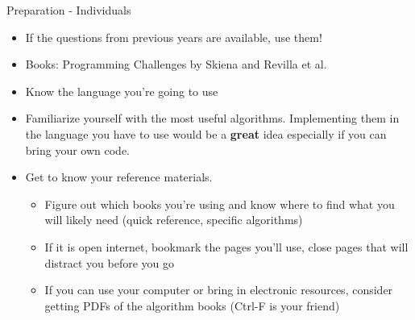 \documentclass{beamer}
\begin{document}
\begin{frame}{Preparation - Individuals}
  \begin{centering}
    \begin{itemize}
      \item If the questions from previous years are available, use them!
      \item Books: Programming Challenges by Skiena and Revilla et al.
      \item Know the language you're going to use
      \item Familiarize yourself with the most useful algorithms. Implementing them in the language you have to use would be a \textbf{great} idea especially if you can bring your own code.
      \item Get to know your reference materials.
        \begin{itemize}
          \item Figure out which books you're using and know where to find what you will likely need (quick reference, specific algorithms)
          \item If it is open internet, bookmark the pages you'll use, close pages that will distract you before you go
          \item If you can use your computer or bring in electronic resources, consider getting PDFs of the algorithm books (Ctrl-F is your friend)
        \end{itemize}
    \end{itemize}
  \end{centering}
\end{frame}
\end{document}
